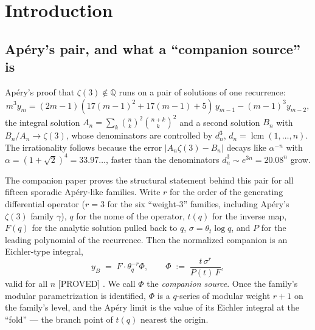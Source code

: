 \documentclass[11pt,reqno]{amsart}
\theoremstyle{plain}
\theoremstyle{definition}
\theoremstyle{remark}
\newcommand{\Q}{\mathbb{Q}}
\newcommand{\thq}{\theta_q}
\newcommand{\tht}{\theta_t}
\newcommand{\Proved}{\textup{\textsf{[PROVED]}}}
\begin{document}
\section{Introduction}\label{sec:intro}

\subsection{Ap\'ery's pair, and what a ``companion source'' is}
Ap\'ery's proof that $\zeta(3)\notin\Q$ runs on a pair of solutions of one
recurrence:
\begin{equation}\label{eq:apery}
m^3y_m=(2m-1)(17(m-1)^2+17(m-1)+5)\,y_{m-1}-(m-1)^3y_{m-2},
\end{equation}
the integral solution $A_n=\sum_k\binom nk^2\binom{n+k}k^2$ and a second
solution $B_n$ with $B_n/A_n\to\zeta(3)$, whose denominators are
controlled by $d_n^3$, $d_n=\operatorname{lcm}(1,\dots,n)$. The
irrationality follows because the error $|A_n\zeta(3)-B_n|$ decays like
$\alpha^{-n}$ with $\alpha=(1+\sqrt2)^4=33.97\ldots$, faster than the
denominators $d_n^3\sim e^{3n}=20.08^n$ grow.

The companion paper \cite{anchors} proves the structural statement behind
this pair for all fifteen sporadic Ap\'ery-like families. Write $r$ for the
order of the generating differential operator ($r=3$ for the six
``weight-$3$'' families, including Ap\'ery's $\zeta(3)$ family $\gamma$),
$q$ for the nome of the operator, $t(q)$ for the inverse map, $F(q)$ for
the analytic solution pulled back to $q$, $\sigma=\tht\log q$, and $P$ for
the leading polynomial of the recurrence. Then the normalized companion is
an Eichler-type integral,
\begin{equation}\label{eq:companion}
y_B\;=\;F\cdot\thq^{-r}\Phi,\qquad
\Phi\;:=\;\frac{t\,\sigma^{r}}{P(t)\,F},
\end{equation}
valid for all $n$ \Proved{} \cite[Thm.~3.4]{anchors}. We call $\Phi$ the
\emph{companion source}. Once the family's modular parametrization is
identified, $\Phi$ is a $q$-series of modular weight $r+1$ on the family's
level, and the Ap\'ery limit is the value of its Eichler integral at the
``fold'' --- the branch point of $t(q)$ nearest the origin.
\end{document}

